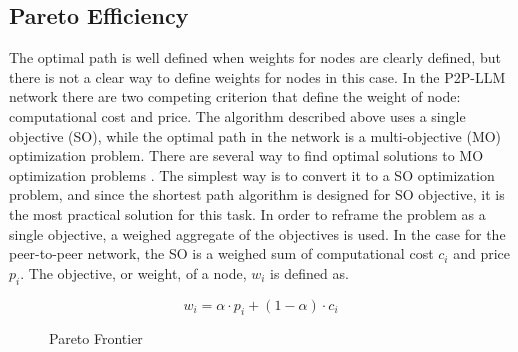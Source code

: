 \documentclass[preprint,twoside,11pt]{article}
\begin{document}
\subsection{Pareto Efficiency}

The optimal path is well defined when weights for nodes are clearly defined, but there is not a clear way to define
weights for nodes in this case. In the P2P-LLM network there are two competing criterion that define the weight of node: computational cost and price.
The algorithm described above uses a single objective (SO), while the optimal path in the network is a multi-objective (MO) optimization problem.
There are several way to find optimal solutions to MO optimization problems \citep{1599245}. The simplest way is to convert it to a SO optimization problem, and
since the shortest path algorithm is designed for SO objective, it is the most practical solution for this task. In order to reframe the problem as a single objective,
a weighed aggregate of the objectives is used. In the case for the peer-to-peer network, the SO is a weighed sum of computational cost $c_i$ and price $p_i$.
The objective, or weight, of a node, $w_i$ is defined as.

\begin{equation}
	w_i = \alpha \cdot p_i + (1 - \alpha) \cdot c_i
	\label{eq:weight}
\end{equation}

\begin{figure}
	\centering
	\caption{Pareto Frontier}
	\label{fig:Pareto-optimal}
\end{figure}
\end{document}
